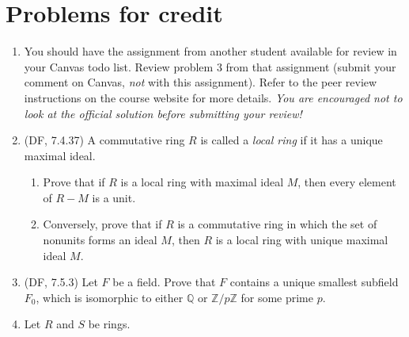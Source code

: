 \documentclass{amsart}
\theoremstyle{definition}
\newcommand{\Zz}{\mathbb{Z}}
\newcommand{\Qq}{\mathbb{Q}}
\begin{document}
\section*{Problems for credit}

\begin{enumerate}
\item You should have the assignment from another student available for review in your Canvas todo list. Review problem 3 from that assignment (submit your comment on Canvas, \emph{not} with this assignment). Refer to the peer review instructions on the course website for more details. \emph{You are encouraged not to look at the official solution before submitting your review!}
\item (DF, 7.4.37) A commutative ring $R$ is called a \emph{local ring} if it has a unique maximal ideal.
  \begin{enumerate}
  \item Prove that if $R$ is a local ring with maximal ideal $M$, then every element of $R - M$ is a unit.
  \item Conversely, prove that if $R$ is a commutative ring in which the set of nonunits forms an ideal $M$, then $R$ is a local ring with unique maximal ideal $M$.
  \end{enumerate}
\item (DF, 7.5.3) Let $F$ be a field. Prove that $F$ contains a unique smallest subfield $F_0$, which is isomorphic to either $\Qq$ or $\Zz / p\Zz$ for some prime $p$.
\item Let $R$ and $S$ be rings.


\end{enumerate}
\end{document}
